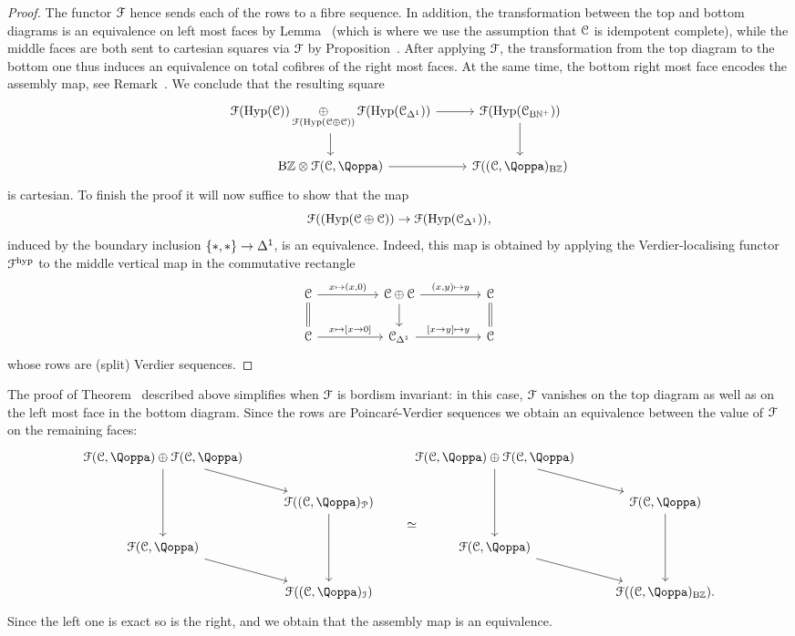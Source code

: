 \begin{proof}
The functor $\mathcal{F}$ hence sends each of the rows to a fibre sequence. In addition, the transformation between the top and bottom diagrams %
is an equivalence on left most faces by Lemma~ (which is where we use the assumption that $\mathcal C$ is idempotent complete), while the middle faces are both sent to cartesian squares via $\mathcal{F}$ by Proposition~. %
After applying $\mathcal{F}$, the transformation from the top diagram to the bottom one thus induces an equivalence on total cofibres of the right most faces. At the same time, the bottom right most face encodes the assembly map, see Remark~.
We conclude that the resulting square
\[
\begin{tikzcd}
\F(\Hyp(\C)) \displaystyle\mathop{\oplus}_{\F(\Hyp(\C \oplus \C))} \F(\Hyp(\C_{\Del^1})) \ar[r]\ar[d] & \F(\Hyp(\C_{\B\NN^+}))\ar[d] \\
{\B\ZZ} \otimes \F(\C,\QF) \ar[r] & \F((\C,\QF)_{\B\ZZ}) 
\end{tikzcd}
\]
is cartesian.
To finish the proof it will now suffice to show that the map
\[
\mathcal{F}((\operatorname{Hyp}(\mathcal C \oplus \mathcal C)) \to \mathcal{F}(\operatorname{Hyp}(\mathcal C_{\Delta^1})),
\]
induced by the boundary inclusion $\{\ast,\ast\} \to \Delta^1$, is an equivalence.
Indeed, this map 
is obtained by applying the Verdier-localising functor $\mathcal{F}^{\mathrm{hyp}}$ to the middle vertical map in the commutative rectangle
\[
\begin{tikzcd}
\C \ar[rr, "{x\mapsto (x,0)} "]\ar[d,equal] && \C \oplus \C\ar[rr, "{(x,y) \mapsto y}"]\ar[d] && \C \ar[d,equal] \\
\C \ar[rr, "{x \mapsto [x \to 0]}"] && \C_{\Del^1} \ar[rr, "{[x\to y] \mapsto y}"] && \C
\end{tikzcd}
\]
whose rows are (split) Verdier sequences. 
\end{proof}



\begin{remark}
\label{remark:proof-for-bordism-invariant}%
The proof of Theorem~ described above simplifies when $\mathcal{F}$ is bordism invariant: in this case, $\mathcal{F}$ vanishes on the top diagram
as well as on the left most face in the bottom diagram. Since the rows are Poincaré-Verdier sequences we obtain an equivalence between the value of $\mathcal{F}$ on the remaining faces:
\[
\begin{tikzcd}
\F(\C,\QF) \oplus \F(\C,\QF)\ar[dd] \ar[dr] && \F(\C,\QF) \oplus \F(\C,\QF)\ar[dd] \ar[dr] & \\
& \F((\C,\QF)_{\mathcal{P}}) \ar[dd]\ar[dr,phantom,"\simeq"] && \F(\C,\QF)\ar[dd] \\
\F(\C,\QF)  \ar[dr] && \F(\C,\QF)\ar[dr]  & \\
& \F((\C,\QF)_\I)  && \F((\C,\QF)_{\B\ZZ}).
\end{tikzcd}
\]
Since the left one is exact so is the right, and we obtain that the assembly map is an equivalence. 
\end{remark}







